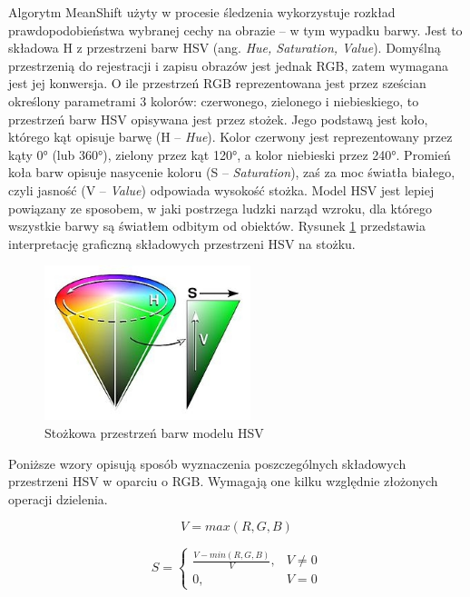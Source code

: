 Algorytm MeanShift użyty w procesie śledzenia wykorzystuje rozkład prawdopodobieństwa wybranej cechy na obrazie -- w tym wypadku barwy. 
Jest to składowa H z przestrzeni barw HSV (ang. \textit{Hue, Saturation, Value}). 
Domyślną przestrzenią do rejestracji i zapisu obrazów jest jednak RGB, zatem wymagana jest jej konwersja. 
O ile przestrzeń RGB reprezentowana jest przez sześcian określony parametrami 3 kolorów: czerwonego, zielonego i niebieskiego, to przestrzeń barw HSV opisywana jest przez stożek. 
Jego podstawą jest koło, którego kąt opisuje barwę (H -- \textit{Hue}). %
Kolor czerwony jest reprezentowany przez kąty 0\si{\degree} (lub 360\si{\degree}), zielony przez kąt 120\si{\degree}, a kolor niebieski przez 240\si{\degree}. 
Promień koła barw opisuje nasycenie koloru (S -- \textit{Saturation}), zaś za moc światła białego, czyli jasność (V -- \textit{Value}) odpowiada wysokość stożka. 
Model HSV jest lepiej powiązany ze sposobem, w jaki postrzega ludzki narząd wzroku, dla którego wszystkie barwy są światłem odbitym od obiektów.
Rysunek \ref{fig:HSV_cone} przedstawia interpretację graficzną składowych przestrzeni HSV na stożku.

\begin{figure}[h]
	\centering
	\includegraphics[width=6cm]{2_HSV.jpg}
	\caption{Stożkowa przestrzeń barw modelu HSV \cite{HSV}} %
	\label{fig:HSV_cone}
\end{figure}

Poniższe wzory opisują sposób wyznaczenia poszczególnych składowych przestrzeni HSV w oparciu o RGB. Wymagają one kilku względnie złożonych operacji dzielenia.

\begin{equation}
\label{HSV_first}
V=max(R,G,B)
\end{equation}

\begin{equation}
S=\begin{cases}
\frac{V-min(R,G,B)}{V}, & V\neq0 \\
0, & V=0
\end{cases}
\end{equation}

